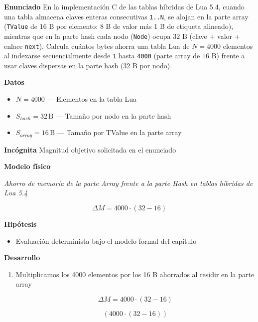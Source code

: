 \documentclass{book}
\begin{document}
\begin{tcolorbox}[title={Problema resuelto}, studiumworked, breakable]

\noindent\textbf{Enunciado}
En la implementación C de las tablas híbridas de Lua 5.4, cuando una tabla almacena claves enteras consecutivas \texttt{1..N}, se alojan en la parte array (\texttt{TValue} de \(16\text{ B}\) por elemento: 8 B de valor más 1 B de etiqueta alineado), mientras que en la parte hash cada nodo (\texttt{Node}) ocupa \(32\text{ B}\) (clave + valor + enlace \texttt{next}). Calcula cuántos bytes ahorra una tabla Lua de \(N = 4000\) elementos al indexarse secuencialmente desde \texttt{1} hasta \texttt{4000} (parte array de \(16\text{ B}\)) frente a usar claves dispersas en la parte hash (\(32\text{ B}\) por nodo).

\noindent\textbf{Datos}
\begin{itemize}
\item $N = 4000$ — Elementos en la tabla Lua
\item $S_{hash} = 32\,\mathrm{B}$ — Tamaño por nodo en la parte hash
\item $S_{array} = 16\,\mathrm{B}$ — Tamaño por TValue en la parte array
\end{itemize}

\noindent\textbf{Incógnita}
Magnitud objetivo solicitada en el enunciado

\noindent\textbf{Modelo físico}

\noindent\textit{Ahorro de memoria de la parte Array frente a la parte Hash en tablas híbridas de Lua 5.4}

\[
\Delta M = 4000 \cdot (32 - 16)
\]

\noindent\textbf{Hipótesis}
\begin{itemize}
\item Evaluación determinista bajo el modelo formal del capítulo
\end{itemize}

\noindent\textbf{Desarrollo}
\begin{enumerate}
\item
Multiplicamos los 4000 elementos por los 16 B ahorrados al residir en la parte array

\[
\Delta M = 4000 \cdot (32 - 16)
\]

\[
\left(4000\cdot \left(32-16\right)\right)
\]
\end{enumerate}


\end{tcolorbox}
\end{document}
